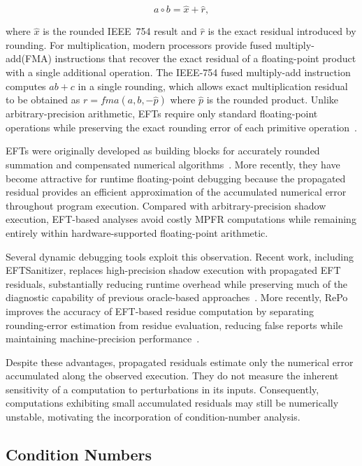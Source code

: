 \[
a \circ b = \hat{x} + \hat{r},
\]

where $\hat{x}$ is the rounded IEEE~754 result and $\hat{r}$ is the exact residual introduced by rounding. For multiplication, modern processors provide fused multiply-add(FMA) instructions that recover the exact residual of a floating-point product with a single additional operation. The IEEE-754 fused multiply-add instruction computes $ab+c$ in a single rounding, which allows exact multiplication residual to be obtained as $r=fma(a, b, -\hat{p})$ where $\hat{p}$ is the rounded product. Unlike arbitrary-precision arithmetic, EFTs require only standard floating-point operations while preserving the exact rounding error of each primitive operation~\cite{ogita2008}.

EFTs were originally developed as building blocks for accurately rounded summation and compensated numerical algorithms~\cite{ogita2008}. More recently, they have become attractive for runtime floating-point debugging because the propagated residual provides an efficient approximation of the accumulated numerical error throughout program execution. Compared with arbitrary-precision shadow execution, EFT-based analyses avoid costly MPFR computations while remaining entirely within hardware-supported floating-point arithmetic.

Several dynamic debugging tools exploit this observation. Recent work, including EFTSanitizer, replaces high-precision shadow execution with propagated EFT residuals, substantially reducing runtime overhead while preserving much of the diagnostic capability of previous oracle-based approaches~\cite{eftsanitizer}. More recently, RePo improves the accuracy of EFT-based residue computation by separating rounding-error estimation from residue evaluation, reducing false reports while maintaining machine-precision performance~\cite{accurate_residues}.

Despite these advantages, propagated residuals estimate only the numerical error accumulated along the observed execution. They do not measure the inherent sensitivity of a computation to perturbations in its inputs. Consequently, computations exhibiting small accumulated residuals may still be numerically unstable, motivating the incorporation of condition-number analysis.

\subsection{Condition Numbers}
\label{sec:back_condition_numbers}

